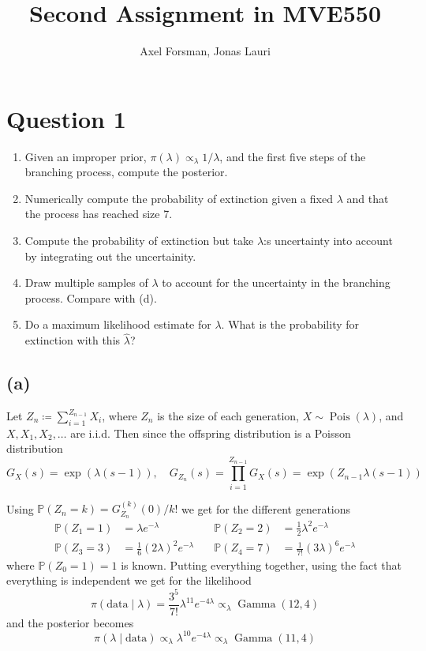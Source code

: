 \documentclass{article}
\title{Second Assignment in MVE550}
\author{Axel Forsman, Jonas Lauri}
\DeclareMathOperator\Poisson{Pois}
\DeclareMathOperator\GammaDist{Gamma}
\begin{document}
\maketitle

\section{Question 1}
\begin{enumerate}[label=(\alph*)]
\item Given an improper prior, $\pi(\lambda) \propto_{\lambda} 1/\lambda$, and the first five steps of the branching process, compute the posterior.
\item Numerically compute the probability of extinction given a fixed $\lambda$ and that the process has reached size 7.
\item Compute the probability of extinction but take $\lambda$:s uncertainty into account by integrating out the uncertainity.
\item Draw multiple samples of $\lambda$ to account for the uncertainty in the branching process. Compare with (d).
\item Do a maximum likelihood estimate for $\lambda$. What is the probability for extinction with this $\hat\lambda$?
\end{enumerate}

\subsection{(a)}
Let $Z_n \coloneqq \sum_{i=1}^{Z_{n-1}} X_i$,
where $Z_n$ is the size of each generation,
$X \sim \Poisson(\lambda)$, and $X, X_1, X_2, \ldots$ are i.i.d.
Then since the offspring distribution is a Poisson distribution
$$ G_X(s) = \exp(\lambda (s - 1)), \quad
G_{Z_n}(s) = \prod_{i=1}^{Z_{n-1}} G_X(s) = \exp(Z_{n-1} \lambda (s - 1)) $$

Using $ \mathbb P(Z_n = k) = G_{Z_n}^{(k)}(0) / k! $
we get for the different generations
\begin{align*}
	\mathbb P(Z_1 = 1) &= \lambda e^{-\lambda} &\quad
	\mathbb P(Z_2 = 2) &= \frac12 \lambda^2 e^{-\lambda} \\
	\mathbb P(Z_3 = 3) &= \frac16 (2\lambda)^2 e^{-\lambda} &\quad
	\mathbb P(Z_4 = 7) &= \frac1{7!} (3\lambda)^6 e^{-\lambda}
\end{align*}
where $\mathbb P(Z_0 = 1) = 1$ is known.
Putting everything together,
using the fact that everything is independent we get for the likelihood
$$ \pi(\text{data} \mid \lambda) = \frac{3^5}{7!} \lambda^{11} e^{-4\lambda}
	\propto_\lambda \GammaDist(12, 4) $$
and the posterior becomes
$$ \pi(\lambda \mid \text{data}) \propto_\lambda \lambda^{10} e^{-4\lambda}
	\propto_\lambda \GammaDist(11, 4) $$
\end{document}
